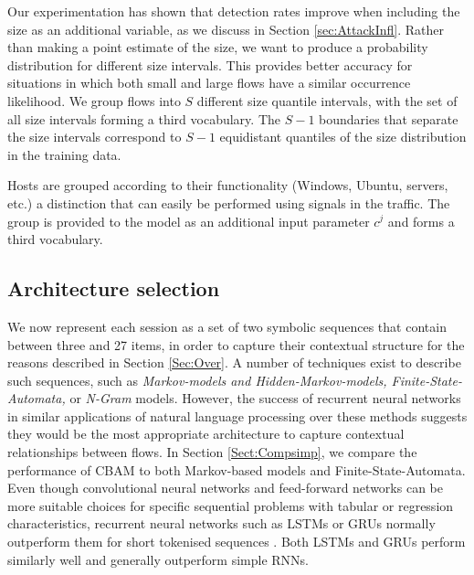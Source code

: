 Our experimentation has shown that detection rates improve when including the size as an additional variable, as we discuss in Section \ref{sec:AttackInfl}. Rather than making a point estimate of the size, we want to produce a probability distribution for different size intervals. This provides better accuracy for situations in which both small and large flows have a similar occurrence likelihood. We group flows into $S$ different size quantile intervals, with the set of all size intervals forming a third vocabulary. The $S-1$ boundaries that separate the size intervals correspond to $S-1$ equidistant quantiles of the size distribution in the training data.

Hosts are grouped according to their functionality (Windows, Ubuntu, servers, etc.) a distinction that can easily be performed using signals in the traffic.  %
The group is provided to the model as an additional input parameter $c^j$ and forms a third vocabulary. 


\subsection{Architecture selection}


We now represent each session as a set of two symbolic sequences that contain between three and 27 items, in order to capture their contextual structure for the reasons described in Section \ref{Sec:Over}. A number of techniques exist to describe such sequences, such as \textit{Markov-models and Hidden-Markov-models, Finite-State-Automata,} or \textit{N-Gram} models. However, the success of recurrent neural networks in similar applications of natural language processing over these methods suggests they would be the most appropriate architecture to capture contextual relationships between flows. In Section \ref{Sect:Compsimp}, we compare the performance of CBAM to both Markov-based models and Finite-State-Automata. Even though convolutional neural networks and feed-forward networks can be more suitable choices for specific sequential problems with tabular or regression characteristics, recurrent neural networks such as LSTMs or GRUs normally outperform them for short tokenised sequences \cite{yin2017comparative}. Both LSTMs and GRUs perform similarly well and generally outperform simple RNNs.





